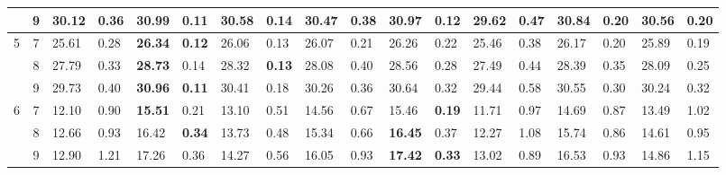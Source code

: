 \documentclass[conference]{IEEEtran}
\begin{document}
\begin{table*}[]
\begin{tabular}{|cc|ll|ll|ll|ll|ll|ll|ll|ll|}
		\multicolumn{1}{|c|}{} & 9 & \multicolumn{1}{l|}{30.12} & 0.36 & \multicolumn{1}{l|}{\textbf{30.99}} & \textbf{0.11} & \multicolumn{1}{l|}{30.58} & 0.14 & \multicolumn{1}{l|}{30.47} & 0.38 & \multicolumn{1}{l|}{30.97} & 0.12 & \multicolumn{1}{l|}{29.62} & 0.47 & \multicolumn{1}{l|}{30.84} & 0.20 & \multicolumn{1}{l|}{30.56} & 0.20 \\ \hline
		\multicolumn{1}{|c|}{\multirow{3}{*}{5}} & 7 & \multicolumn{1}{l|}{25.61} & 0.28 & \multicolumn{1}{l|}{\textbf{26.34}} & \textbf{0.12} & \multicolumn{1}{l|}{26.06} & 0.13 & \multicolumn{1}{l|}{26.07} & 0.21 & \multicolumn{1}{l|}{26.26} & 0.22 & \multicolumn{1}{l|}{25.46} & 0.38 & \multicolumn{1}{l|}{26.17} & 0.20 & \multicolumn{1}{l|}{25.89} & 0.19 \\ \cline{2-18} 
		\multicolumn{1}{|c|}{} & 8 & \multicolumn{1}{l|}{27.79} & 0.33 & \multicolumn{1}{l|}{\textbf{28.73}} & 0.14 & \multicolumn{1}{l|}{28.32} & \textbf{0.13} & \multicolumn{1}{l|}{28.08} & 0.40 & \multicolumn{1}{l|}{28.56} & 0.28 & \multicolumn{1}{l|}{27.49} & 0.44 & \multicolumn{1}{l|}{28.39} & 0.35 & \multicolumn{1}{l|}{28.09} & 0.25 \\ \cline{2-18} 
		\multicolumn{1}{|c|}{} & 9 & \multicolumn{1}{l|}{29.73} & 0.40 & \multicolumn{1}{l|}{\textbf{30.96}} & \textbf{0.11} & \multicolumn{1}{l|}{30.41} & 0.18 & \multicolumn{1}{l|}{30.26} & 0.36 & \multicolumn{1}{l|}{30.64} & 0.32 & \multicolumn{1}{l|}{29.44} & 0.58 & \multicolumn{1}{l|}{30.55} & 0.30 & \multicolumn{1}{l|}{30.24} & 0.32 \\ \hline
		\multicolumn{1}{|c|}{\multirow{3}{*}{6}} & 7 & \multicolumn{1}{l|}{12.10} & 0.90 & \multicolumn{1}{l|}{\textbf{15.51}} & 0.21 & \multicolumn{1}{l|}{13.10} & 0.51 & \multicolumn{1}{l|}{14.56} & 0.67 & \multicolumn{1}{l|}{15.46} & \textbf{0.19} & \multicolumn{1}{l|}{11.71} & 0.97 & \multicolumn{1}{l|}{14.69} & 0.87 & \multicolumn{1}{l|}{13.49} & 1.02 \\ \cline{2-18} 
		\multicolumn{1}{|c|}{} & 8 & \multicolumn{1}{l|}{12.66} & 0.93 & \multicolumn{1}{l|}{16.42} & \textbf{0.34} & \multicolumn{1}{l|}{13.73} & 0.48 & \multicolumn{1}{l|}{15.34} & 0.66 & \multicolumn{1}{l|}{\textbf{16.45}} & 0.37 & \multicolumn{1}{l|}{12.27} & 1.08 & \multicolumn{1}{l|}{15.74} & 0.86 & \multicolumn{1}{l|}{14.61} & 0.95 \\ \cline{2-18} 
		\multicolumn{1}{|c|}{} & 9 & \multicolumn{1}{l|}{12.90} & 1.21 & \multicolumn{1}{l|}{17.26} & 0.36 & \multicolumn{1}{l|}{14.27} & 0.56 & \multicolumn{1}{l|}{16.05} & 0.93 & \multicolumn{1}{l|}{\textbf{17.42}} & \textbf{0.33} & \multicolumn{1}{l|}{13.02} & 0.89 & \multicolumn{1}{l|}{16.53} & 0.93 & \multicolumn{1}{l|}{14.86} & 1.15 \\ \hline

\end{tabular}
\end{table*}
\end{document}
